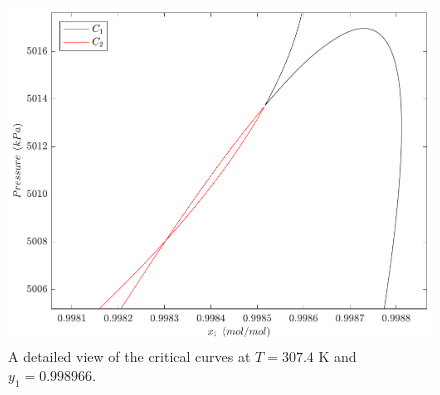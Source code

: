 \documentclass[journal=iecred,manuscript=article]{achemso}
\theoremstyle{definition}
\theoremstyle{remark}
\begin{document}
\begin{figure}
	\begin{center}
		\includegraphics[scale=0.50]{curvas_criticas_dominio_new.pdf}
		\caption{A detailed view of the critical curves at $ T = 307.4 $ K and $ y_{1} = 0.998966 $.}\label{fig:sinais}
	\end{center}
\end{figure}
\end{document}
